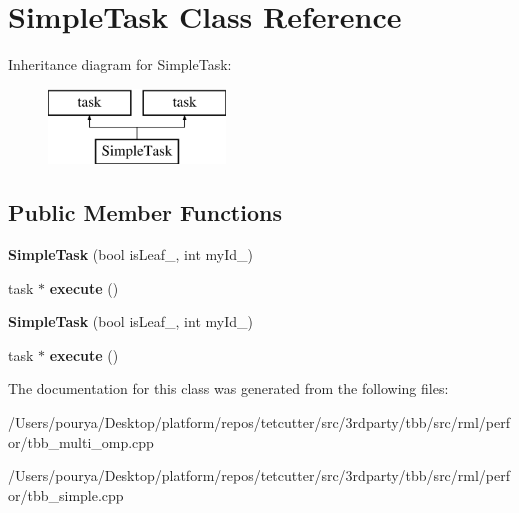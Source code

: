 \hypertarget{classSimpleTask}{}\section{Simple\+Task Class Reference}
\label{classSimpleTask}
Inheritance diagram for Simple\+Task\+:\begin{figure}[H]
\begin{center}
\leavevmode
\includegraphics[height=2.000000cm]{classSimpleTask}
\end{center}
\end{figure}
\subsection*{Public Member Functions}
\begin{DoxyCompactItemize}
\item 
\hypertarget{classSimpleTask_a8bb920a97b6ecf43acfaf0b787ef36e7}{}{\bfseries Simple\+Task} (bool is\+Leaf\+\_\+, int my\+Id\+\_\+)\label{classSimpleTask_a8bb920a97b6ecf43acfaf0b787ef36e7}

\item 
\hypertarget{classSimpleTask_a3bfb2dd857e9a3a6b0b0199876a0abf3}{}task $\ast$ {\bfseries execute} ()\label{classSimpleTask_a3bfb2dd857e9a3a6b0b0199876a0abf3}

\item 
\hypertarget{classSimpleTask_a8bb920a97b6ecf43acfaf0b787ef36e7}{}{\bfseries Simple\+Task} (bool is\+Leaf\+\_\+, int my\+Id\+\_\+)\label{classSimpleTask_a8bb920a97b6ecf43acfaf0b787ef36e7}

\item 
\hypertarget{classSimpleTask_a3bfb2dd857e9a3a6b0b0199876a0abf3}{}task $\ast$ {\bfseries execute} ()\label{classSimpleTask_a3bfb2dd857e9a3a6b0b0199876a0abf3}

\end{DoxyCompactItemize}


The documentation for this class was generated from the following files\+:\begin{DoxyCompactItemize}
\item 
/\+Users/pourya/\+Desktop/platform/repos/tetcutter/src/3rdparty/tbb/src/rml/perfor/tbb\+\_\+multi\+\_\+omp.\+cpp\item 
/\+Users/pourya/\+Desktop/platform/repos/tetcutter/src/3rdparty/tbb/src/rml/perfor/tbb\+\_\+simple.\+cpp\end{DoxyCompactItemize}
